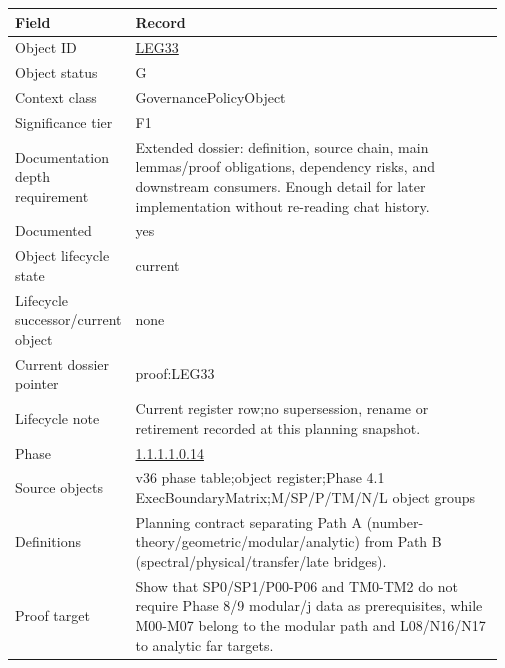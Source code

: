 \begin{longtable}{L{0.16\linewidth} L{0.81\linewidth}}
\hline
\textbf{Field} & \textbf{Record}\\
\hline
Object ID & \hyperlink{object-row-LEG33}{LEG33}\\
\hline\addlinespace[0.20em]
Object status & G\\
\hline\addlinespace[0.20em]
Context class & GovernancePolicyObject\\
\hline\addlinespace[0.20em]
Significance tier & F1\\
\hline\addlinespace[0.20em]
Documentation depth requirement & Extended dossier: definition, source chain, main lemmas/\allowbreak{}proof obligations, dependency risks, and downstream consumers. Enough detail for later implementation without re-reading chat history.\\
\hline\addlinespace[0.20em]
Documented & yes\\
\hline\addlinespace[0.20em]
Object lifecycle state & current\\
\hline\addlinespace[0.20em]
Lifecycle successor/\allowbreak{}current object & none\\
\hline\addlinespace[0.20em]
Current dossier pointer & proof:LEG33\\
\hline\addlinespace[0.20em]
Lifecycle note & Current register row;\newline no supersession, rename or retirement recorded at this planning snapshot.\\
\hline\addlinespace[0.20em]
Phase & \hyperlink{phase-row-1-1-1-1-0-14}{1.1.1.1.0.14}\\
\hline\addlinespace[0.20em]
Source objects & v36 phase table;\newline object register;\newline Phase 4.1 ExecBoundaryMatrix;\newline M/\allowbreak{}SP/\allowbreak{}P/\allowbreak{}TM/\allowbreak{}N/\allowbreak{}L object groups\\
\hline\addlinespace[0.20em]
Definitions & Planning contract separating Path A (number-theory/\allowbreak{}geometric/\allowbreak{}modular/\allowbreak{}analytic) from Path B (spectral/\allowbreak{}physical/\allowbreak{}transfer/\allowbreak{}late bridges).\\
\hline\addlinespace[0.20em]
Proof target & Show that SP0/\allowbreak{}SP1/\allowbreak{}P00-P06 and TM0-TM2 do not require Phase 8/\allowbreak{}9 modular/\allowbreak{}j data as prerequisites, while M00-M07 belong to the modular path and L08/\allowbreak{}N16/\allowbreak{}N17 to analytic far targets.\\

\end{longtable}
